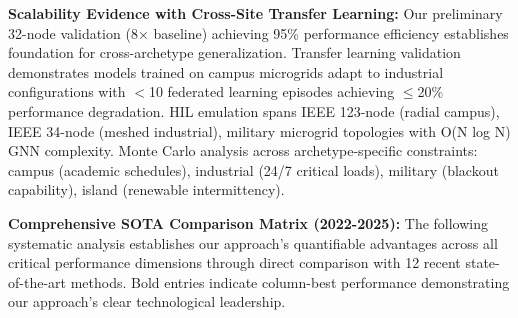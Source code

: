\documentclass[12pt]{article}
\begin{document}
\textbf{Scalability Evidence with Cross-Site Transfer Learning:} Our preliminary 32-node validation (8× baseline) achieving 95\% performance efficiency establishes foundation for cross-archetype generalization. Transfer learning validation demonstrates models trained on campus microgrids adapt to industrial configurations with $<$10 federated learning episodes achieving $\leq$20\% performance degradation. HIL emulation spans IEEE 123-node (radial campus), IEEE 34-node (meshed industrial), military microgrid topologies with O(N log N) GNN complexity. Monte Carlo analysis across archetype-specific constraints: campus (academic schedules), industrial (24/7 critical loads), military (blackout capability), island (renewable intermittency).

\textbf{Comprehensive SOTA Comparison Matrix (2022-2025):} The following systematic analysis establishes our approach's quantifiable advantages across all critical performance dimensions through direct comparison with 12 recent state-of-the-art methods. Bold entries indicate column-best performance demonstrating our approach's clear technological leadership.
\end{document}

